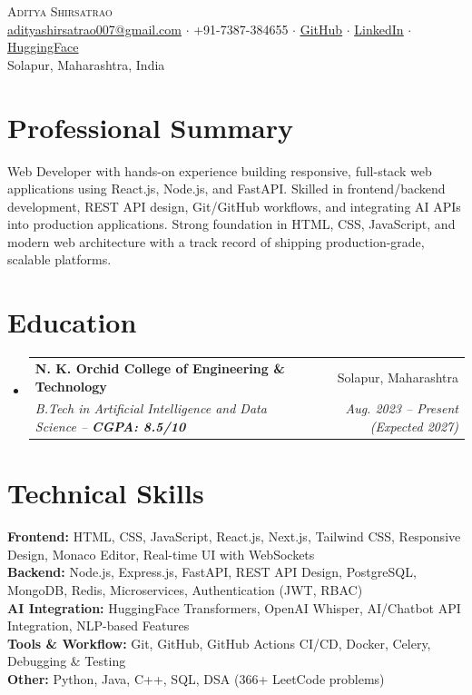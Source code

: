 \documentclass[letterpaper,11pt]{article}
\makeatletter
\newcommand{\resumeSubheading}[4]{
  \vspace{-2pt}\item
  \begin{tabular*}{0.97\textwidth}[t]{l@{\extracolsep{\fill}}r}
    \textbf{#1} & #2 \\
    \textit{\small #3} & \textit{\small #4} \\
  \end{tabular*}\vspace{-7pt}
}
\newcommand{\resumeSubHeadingListStart}{
\begin{itemize}[leftmargin=0.15in, label={}]
}
\newcommand{\resumeSubHeadingListEnd}{
\end{itemize}
}
\makeatother
\begin{document}
\begin{center}
    {\Huge \scshape \color{darkblue} Aditya Shirsatrao} \\ \vspace{3pt}
    \small
    \href{mailto:adityashirsatrao007@gmail.com}{\underline{adityashirsatrao007@gmail.com}} $\cdot$
    +91-7387-384655 $\cdot$
    \href{https://github.com/adityashirsatrao007}{\underline{GitHub}} $\cdot$
    \href{https://www.linkedin.com/in/adityashirsatrao}{\underline{LinkedIn}} $\cdot$
    \href{https://huggingface.co/adityashirsatrao007}{\underline{HuggingFace}} \\
    \small Solapur, Maharashtra, India
\end{center}

\section{Professional Summary}
\small{
Web Developer with hands-on experience building responsive, full-stack web applications using React.js, Node.js, and FastAPI. Skilled in frontend/backend development, REST API design, Git/GitHub workflows, and integrating AI APIs into production applications. Strong foundation in HTML, CSS, JavaScript, and modern web architecture with a track record of shipping production-grade, scalable platforms.
}

\section{Education}
\resumeSubHeadingListStart
\resumeSubheading
{N. K. Orchid College of Engineering \& Technology}{Solapur, Maharashtra}
{B.Tech in Artificial Intelligence and Data Science -- \textbf{CGPA: 8.5/10}}{Aug. 2023 -- Present (Expected 2027)}
\resumeSubHeadingListEnd

\section{Technical Skills}
\begin{itemize}[leftmargin=0.15in, label={}]
\small{
\item{
\textbf{Frontend:} HTML, CSS, JavaScript, React.js, Next.js, Tailwind CSS, Responsive Design, Monaco Editor, Real-time UI with WebSockets \\
\textbf{Backend:} Node.js, Express.js, FastAPI, REST API Design, PostgreSQL, MongoDB, Redis, Microservices, Authentication (JWT, RBAC) \\
\textbf{AI Integration:} HuggingFace Transformers, OpenAI Whisper, AI/Chatbot API Integration, NLP-based Features \\
\textbf{Tools \& Workflow:} Git, GitHub, GitHub Actions CI/CD, Docker, Celery, Debugging \& Testing \\
\textbf{Other:} Python, Java, C++, SQL, DSA (366+ LeetCode problems)
}
}
\end{itemize}
\end{document}
